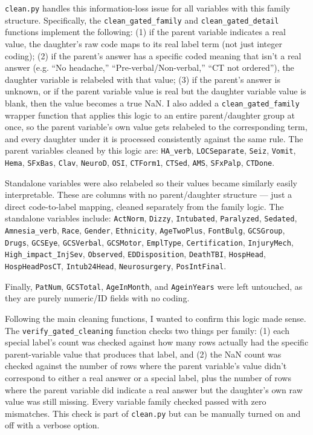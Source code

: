 \documentclass[10pt,letterpaper]{article}
\begin{document}
\texttt{clean.py} handles this information-loss issue for all variables with this family
structure. Specifically, the \texttt{clean\_gated\_family} and \texttt{clean\_gated\_detail}
functions implement the following: (1) if the parent variable indicates a real value, the
daughter's raw code maps to its real label term (not just integer coding); (2) if the parent's
answer has a specific coded meaning that isn't a real answer (e.g. ``No headache,''
``Pre-verbal/Non-verbal,'' ``CT not ordered''), the daughter variable is relabeled with that value;
(3) if the parent's answer is unknown, or if the parent variable value is real but the daughter
variable value is blank, then the value becomes a true NaN. I also added a
\texttt{clean\_gated\_family} wrapper function that applies this logic to an entire parent/daughter
group at once, so the parent variable's own value gets relabeled to the corresponding term, and
every daughter under it is processed consistently against the same rule. The parent variables
cleaned by this logic are: \texttt{HA\_verb}, \texttt{LOCSeparate}, \texttt{Seiz}, \texttt{Vomit},
\texttt{Hema}, \texttt{SFxBas}, \texttt{Clav}, \texttt{NeuroD}, \texttt{OSI}, \texttt{CTForm1},
\texttt{CTSed}, \texttt{AMS}, \texttt{SFxPalp}, \texttt{CTDone}.

Standalone variables were also relabeled so their values became similarly easily interpretable. These are
columns with no parent/daughter structure --- just a direct code-to-label mapping, cleaned
separately from the family logic. The standalone variables include: \texttt{ActNorm},
\texttt{Dizzy}, \texttt{Intubated}, \texttt{Paralyzed}, \texttt{Sedated}, \texttt{Amnesia\_verb},
\texttt{Race}, \texttt{Gender}, \texttt{Ethnicity}, \texttt{AgeTwoPlus}, \texttt{FontBulg},
\texttt{GCSGroup}, \texttt{Drugs}, \texttt{GCSEye}, \texttt{GCSVerbal}, \texttt{GCSMotor},
\texttt{EmplType}, \texttt{Certification}, \texttt{InjuryMech}, \texttt{High\_impact\_InjSev},
\texttt{Observed}, \texttt{EDDisposition}, \texttt{DeathTBI}, \texttt{HospHead},
\texttt{HospHeadPosCT}, \texttt{Intub24Head}, \texttt{Neurosurgery}, \texttt{PosIntFinal}.

Finally, \texttt{PatNum}, \texttt{GCSTotal}, \texttt{AgeInMonth}, and \texttt{AgeinYears} were left
untouched, as they are purely numeric/ID fields with no coding.

Following the main cleaning functions, I wanted to confirm this logic made sense. The
\texttt{verify\_gated\_cleaning} function checks two things per family: (1) each special label's
count was checked against how many rows actually had the specific parent-variable value that
produces that label, and (2) the NaN count was checked against the number of rows where the parent
variable's value didn't correspond to either a real answer or a special label, plus the number of
rows where the parent variable did indicate a real answer but the daughter's own raw value was
still missing. Every variable family checked passed with zero mismatches. This check is part of
\texttt{clean.py} but can be manually turned on and off with a verbose option.
\end{document}
